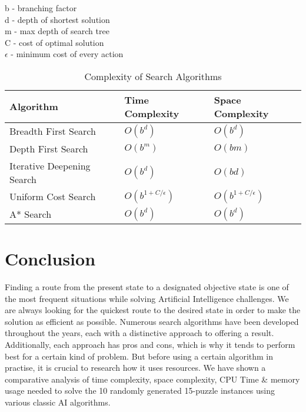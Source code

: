 \documentclass[12pt]{article}
\begin{document}
b - branching factor \\
d - depth of shortest solution \\
m - max depth of search tree \\
C - cost of optimal solution \\
$\epsilon$ - minimum cost of every action \\
\begin{table}[h]
    \centering
    \begin{tabular}{|p{2in}|p{1.5in}|p{1.5in}|}
        \hline
        \textbf{Algorithm} & \textbf{Time Complexity} & \textbf{Space Complexity} \\
        \hline
        Breadth First Search & $O(b^d)$ & $O(b^d)$ \\
        Depth First Search & $O(b^m)$ & $O(bm)$ \\
        Iterative Deepening Search & $O(b^d)$ & $O(bd)$ \\
        Uniform Cost Search & $O(b^{1 + C/\epsilon})$ & $O(b^{1 + C/\epsilon})$ \\
        A* Search & $O(b^d)$ & $O(b^d)$ \\
        \hline
    \end{tabular}
    \caption{Complexity of Search Algorithms}
    \label{tab:complexity_table}
\end{table}

\section{Conclusion}
Finding a route from the present state to a designated objective state is one of the most frequent situations while solving Artificial Intelligence challenges. We are always looking for the quickest route to the desired state in order to make the solution as efficient as possible. Numerous search algorithms have been developed throughout the years, each with a distinctive approach to offering a result. Additionally, each approach has pros and cons, which is why it tends to perform best for a certain kind of problem. But before using a certain algorithm in practise, it is crucial to research how it uses resources. We have shown a comparative analysis of time complexity, space complexity, CPU Time \& memory usage needed to solve the 10 randomly generated 15-puzzle instances using various classic AI algorithms.
\end{document}
